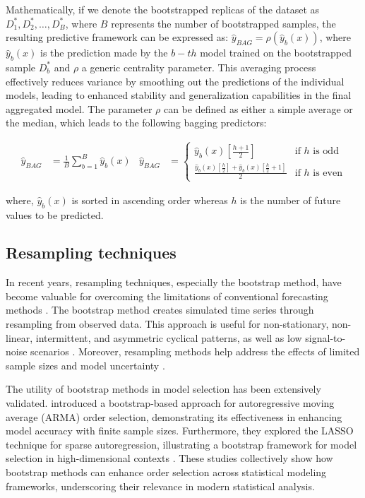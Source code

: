 \documentclass{itor}
\begin{document}
Mathematically, if we denote the bootstrapped replicas of the dataset as $D^*_1, D^*_2, \ldots, D^*_B$, where $B$  represents the number of bootstrapped samples, the resulting predictive framework can be expressed as:  $\hat{y}_{\textit{BAG}} = \rho( \hat{y}_{b}(x) )$, where $\hat{y}_{b}(x)$ is the prediction made by the $b-th$ model trained on the bootstrapped sample $ D^*_b $  and $\rho$ a generic centrality parameter. 
This averaging process effectively reduces variance by smoothing out the predictions of the individual models, leading to enhanced stability and generalization capabilities in the final aggregated model.  The parameter $\rho$ can be defined as either a simple average or the median, which leads to the following bagging predictors:

\begin{align}
	\hat{y}_{\textit{BAG}} &= \frac{1}{B} \sum_{b=1}^{B} \hat{y}_{b}(x) &
	\hat{y}_{\textit{BAG}} &=
	\begin{cases}
		\hat{y}_{b}(x)\left[\frac{h+1}{2}\right] & \text{if } h \text{ is odd} \\
		\frac{\hat{y}_{b}(x)\left[\frac{h}{2}\right] + \hat{y}_{b}(x)\left[\frac{h}{2} + 1\right]}{2} & \text{if } h \text{ is even}
	\end{cases}
\end{align}

\noindent where, $\hat{y}_{b}(x)$  is  sorted in ascending order whereas $h$ is the number of future values to be predicted.

\subsection{Resampling techniques} \label{Subsec:resampling}

In recent years, resampling techniques, especially the bootstrap method, have become valuable for overcoming the limitations of conventional forecasting methods \citep{hasni2019spare}. The bootstrap method creates simulated time series through resampling from observed data. This approach is useful for non-stationary, non-linear, intermittent, and asymmetric cyclical patterns, as well as low signal-to-noise scenarios \citep{feliu2024enhancing, kreiss2012bootstrap}. Moreover, resampling methods help address the effects of limited sample sizes \citep{davison1997bootstrap}  and model uncertainty \citep{sarris2020exploiting}. 

The utility of bootstrap methods in model selection has been extensively validated. \citet{fenga2011bootstrap} introduced a bootstrap-based approach for autoregressive moving average (ARMA) order selection, demonstrating its effectiveness in enhancing model accuracy with finite sample sizes. Furthermore, they explored the LASSO technique for sparse autoregression, illustrating a bootstrap framework for model selection in high-dimensional contexts \citep{fenga2017lasso}. These studies collectively show how bootstrap methods can enhance order selection across statistical modeling frameworks, underscoring their relevance in modern statistical analysis.
\end{document}
